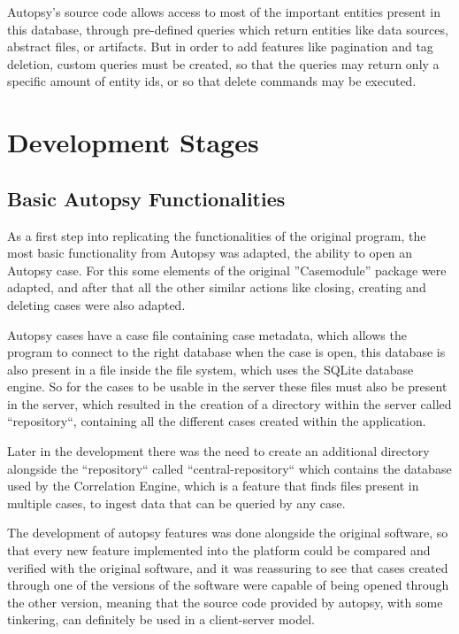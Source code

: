 Autopsy's source code allows access to most of the important entities present in this database, through pre-defined queries which return entities like data sources, abstract files, or artifacts. 
But in order to add features like pagination and tag deletion, custom queries must be created, so that the queries may return only a specific amount of entity ids, or so that delete commands may be executed. 

\section{Development Stages}

\subsection{Basic Autopsy Functionalities}

As a first step into replicating the functionalities of the original program, the most basic functionality from Autopsy was adapted, the ability to open an Autopsy case. For this some elements of the original ''Casemodule'' package were adapted,
and after that all the other similar actions like closing, creating and deleting cases were also adapted.

Autopsy cases have a case file containing case metadata, which allows the program to connect to the right database when the case is open, this database is also present
in a file inside the file system, which uses the SQLite database engine. So for the cases to be usable in the server these files must also be present in the server,
which resulted in the creation of a directory within the server called ``repository``, containing all the different cases created within the application.

Later in the development there was the need to create an additional directory alongside the ``repository`` called ``central-repository``
which contains the database used by the Correlation Engine, which is a feature that finds files present in multiple cases, to ingest data that can be queried by any case.

The development of autopsy features was done alongside the original software, so that every new feature implemented into the platform could be compared and verified with the original software, and it was reassuring to see that cases created 
through one of the versions of the software were capable of being opened through the other version, meaning that the source code provided by autopsy, with some tinkering, can definitely be used in a client-server model.

